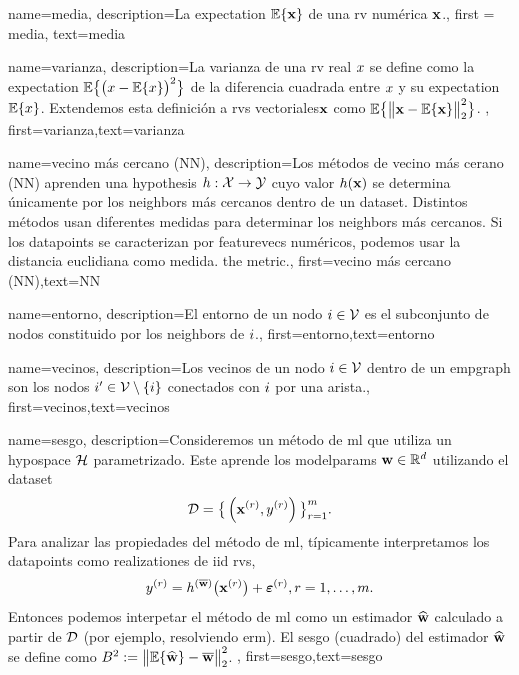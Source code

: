 {
	name=media,
	description={La \gls{expectation} $\mathbb{E} \{ {\bf x} \}$ de una \gls{rv} numérica ${\bf x}$.}, 
		first = {media}, text={media} 
}

{
	name={varianza},
	description={La varianza de una \gls{rv} real $x$ se define como la \gls{expectation} 
		$\mathbb{E}\big\{ \big( x - \mathbb{E}\{x \} \big)^{2} \big\}$ de la diferencia cuadrada entre $x$ 
		y su \gls{expectation} $\mathbb{E}\{x \}$. Extendemos esta definición a \gls{rv}s vectoriales${\bf x}$ 
		como $\mathbb{E}\big\{ \big\| {\bf x} - \mathbb{E}\{{\bf x} \} \big\|_{2}^{2} \big\}$.} ,
		first={varianza},text={varianza} 
}

{
	name={vecino más cercano (NN)},
	description={Los métodos de vecino más cerano (NN) aprenden una \gls{hypothesis} 
		$h: \mathcal{X} \rightarrow \mathcal{Y}$ cuyo valor $h({\bf x})$ 
		se determina únicamente por los \gls{neighbors} más cercanos dentro de un \gls{dataset}. Distintos 
		métodos usan diferentes medidas para determinar los \gls{neighbors} más cercanos. Si los \gls{datapoint}s 
		se caracterizan por \gls{featurevec}s numéricos, podemos usar la distancia euclidiana como medida.  
		the metric.},
	first={vecino más cercano (NN)},text={NN} 
}

{
	name={entorno},
	description={El entorno de un nodo $i \in \mathcal{V}$ es 
	el subconjunto de nodos constituido por los \gls{neighbors} de $i$.},
	first={entorno},text={entorno} 
}

{
	name={vecinos},
	description={Los vecinos de un nodo $i \in \mathcal{V}$ 
	dentro de un \gls{empgraph} son los nodos $i' \in \mathcal{V} \setminus \{ i\}$ conectados con $i$ por una arista.},
	first={vecinos},text={vecinos} 
}

{
	name={sesgo},
	description={Consideremos un método de \gls{ml} que utiliza un \gls{hypospace} $\mathcal{H}$ parametrizado. 
		Este aprende los \gls{modelparams} ${\bf w} \in \mathbb{R}^{d}$ utilizando el \gls{dataset} $$ \mathcal{D}=\big\{ \left( {\bf x}^{(r)},y^{(r)} \right) \big\}_{r=1}^{m}.$$ 
		Para analizar las propiedades del método de \gls{ml}, típicamente interpretamos los \gls{datapoint}s como \gls{realization}es 
		de \gls{iid} \gls{rv}s, $$ y^{(r)} = h^{(\overline{{\bf w}})}\big( {\bf x}^{(r)} \big) + \bm{\varepsilon}^{(r)}, r=1,\ldots,m.$$ 
		Entonces podemos interpetar el método de \gls{ml} como un estimador $\widehat{{\bf w}}$ 
		calculado a partir de $\mathcal{D}$ (por ejemplo, resolviendo \gls{erm}). El sesgo (cuadrado) del estimador $\widehat{{\bf w}}$ 
		se define como $B^{2} := \big\| \mathbb{E} \{ \widehat{{\bf w}}  \}- \overline{{\bf w}}\big\|_{2}^{2}$. },
		first={sesgo},text={sesgo} 
}

